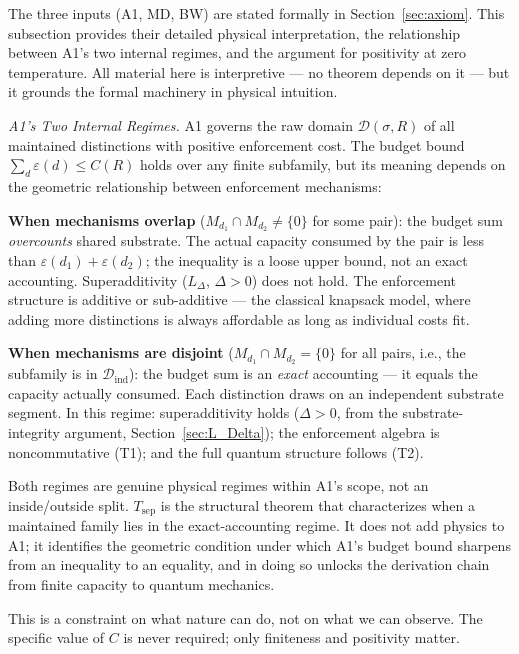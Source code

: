 \documentclass[11pt]{article}
\theoremstyle{remark}
\begin{document}
The three inputs (A1, MD, BW) are stated formally in Section~\ref{sec:axiom}.  This subsection provides their detailed physical interpretation, the relationship between A1's two internal regimes, and the argument for positivity at zero temperature.  All material here is interpretive --- no theorem depends on it --- but it grounds the formal machinery in physical intuition.


\medskip\noindent\textit{A1's Two Internal Regimes.}
\label{cor:disjoint_mech}
A1 governs the raw domain $\mathcal{D}(\sigma,R)$ of all maintained distinctions with positive enforcement cost.  The budget bound $\sum_{d} \varepsilon(d) \le C(R)$ holds over any finite subfamily, but its meaning depends on the geometric relationship between enforcement mechanisms:

\textbf{When mechanisms overlap} ($M_{d_1} \cap M_{d_2} \ne \{0\}$ for some pair): the budget sum \emph{overcounts} shared substrate.  The actual capacity consumed by the pair is less than $\varepsilon(d_1) + \varepsilon(d_2)$; the inequality is a loose upper bound, not an exact accounting.  Superadditivity ($L_\Delta$, $\Delta > 0$) does not hold.  The enforcement structure is additive or sub-additive --- the classical knapsack model, where adding more distinctions is always affordable as long as individual costs fit.

\textbf{When mechanisms are disjoint} ($M_{d_1} \cap M_{d_2} = \{0\}$ for all pairs, i.e., the subfamily is in $\mathcal{D}_{\mathrm{ind}}$): the budget sum is an \emph{exact} accounting --- it equals the capacity actually consumed.  Each distinction draws on an independent substrate segment.  In this regime: superadditivity holds ($\Delta > 0$, from the substrate-integrity argument, Section~\ref{sec:L_Delta}); the enforcement algebra is noncommutative (T1); and the full quantum structure follows (T2).

Both regimes are genuine physical regimes within A1's scope, not an inside/outside split.  $T_{\mathrm{sep}}$ is the structural theorem that characterizes when a maintained family lies in the exact-accounting regime.  It does not add physics to A1; it identifies the geometric condition under which A1's budget bound sharpens from an inequality to an equality, and in doing so unlocks the derivation chain from finite capacity to quantum mechanics.


This is a constraint on what nature can do, not on what we can observe.  The specific value of $C$ is never required; only finiteness and positivity matter.
\end{document}
